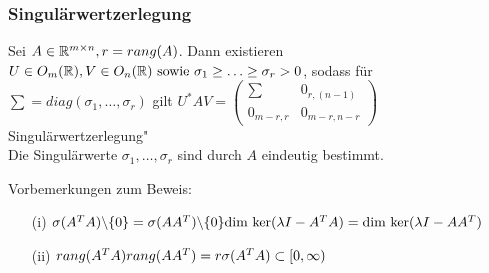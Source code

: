 \subsubsection{Singulärwertzerlegung}
\begin{Satz}
	Sei $A \in \mathbb R^{m \times n}, r=rang(A)$. Dann existieren $U \in O_m(\mathbb R), V \in O_n(\mathbb R) \text{ sowie } \sigma_1 \ge \ldots \ge \sigma_r>0$, sodass für $\sum=diag(\sigma_1,\ldots,\sigma_r)$ gilt $U^*AV=\begin{pmatrix}
	\sum & 0_{r,(n-1)}\\
	0_{m-r,r} & 0_{m-r,n-r}
	\end{pmatrix}$\\\glqq Singulärwertzerlegung"\\
	Die Singulärwerte $\sigma_1,\ldots,\sigma_r$ sind durch $A$ eindeutig bestimmt.
\end{Satz}
Vorbemerkungen zum Beweis:\\
\begin{itemize}
	\item[(i)]$\sigma(A^TA)\backslash\{0\} = \sigma(AA^T)\backslash\{0\}\\ \text{dim ker}(\lambda I-A^TA)=\text{dim ker}(\lambda I-AA^T)$
	\item[(ii)]$rang(A^TA)rang(AA^T)=r\\ \sigma(A^TA) \subset [0,\infty)$
\end{itemize}
